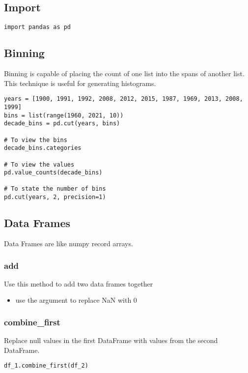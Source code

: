 \subsection{Import}
\begin{lstlisting}
import pandas as pd
\end{lstlisting}

\subsection{Binning}
Binning is capable of placing the count of one list into the spans of another
list. This technique is useful for generating histograms.

\begin{lstlisting}
years = [1900, 1991, 1992, 2008, 2012, 2015, 1987, 1969, 2013, 2008, 1999]
bins = list(range(1960, 2021, 10))
decade_bins = pd.cut(years, bins)

# To view the bins
decade_bins.categories

# To view the values
pd.value_counts(decade_bins)

# To state the number of bins
pd.cut(years, 2, precision=1)
\end{lstlisting}

\subsection{Data Frames}
Data Frames are like numpy record arrays.

%
\subsubsection{add}
Use this method to add two data frames together
  \begin{itemize}
    \item use the {\color{red}{fill\_value=0}} argument to replace NaN with 0
  \end{itemize}

%
\subsubsection{combine\_first}
Replace null values in the first DataFrame with values from the second
DataFrame.

{\color{red}{Note: If the first DataFrame is missing a row that exists in the
  second DataFrame that row will be added as well.}}
\begin{lstlisting}
df_1.combine_first(df_2)
\end{lstlisting}


